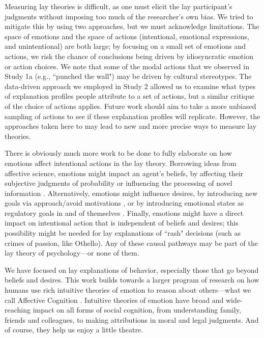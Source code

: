 \documentclass[10pt,letterpaper]{article}
\begin{document}
Measuring lay theories is difficult, as one must elicit the lay participant's judgments without imposing too much of the researcher's own bias. We tried to mitigate this by using two approaches, but we must acknowledge limitations. The space of emotions and the space of actions (intentional, emotional expressions, and unintentional) are both large; by focusing on a small set of emotions and actions, we risk the chance of conclusions being driven by idiosyncratic emotion or action choices. We note that some of the modal actions that we observed in Study 1a (e.g., ``punched the wall") may be driven by cultural stereotypes. The data-driven approach we employed in Study 2 allowed us to examine what types of explanation profiles people attribute to a set of actions, but a similar critique of the choice of actions applies. Future work should aim to take a more unbiased sampling of actions to see if these explanation profiles will replicate. However, the approaches taken here to may lead to new and more precise ways to measure lay theories.

There is obviously much more work to be done to fully elaborate on how emotions affect intentional actions in the lay theory. Borrowing ideas from affective science, emotions might impact an agent's beliefs, by affecting their subjective judgments of probability \cite{Wright1992} or influencing the processing of novel information \cite{Forgas1995}. Alternatively, emotions might influence desires, by introducing new goals via approach/avoid motivations \cite{Carver2004}, or by introducing emotional states as regulatory goals in and of themselves \cite{Gross2006}. Finally, emotions might have a direct impact on intentional action that is independent of beliefs and desires; this possibility might be needed for lay explanations of ``rash" decisions (such as crimes of passion, like Othello). 
Any of these causal pathways may be part of the lay theory of psychology---or none of them.




We have focused on lay explanations of behavior, especially those that go beyond beliefs and desires. This work builds towards a larger program of research on how humans use rich intuitive theories of emotion to reason about others---what we call Affective Cognition \cite{Ong2015AffCog}. Intuitive theories of emotion have broad and wide-reaching impact on all forms of social cognition, from understanding family, friends and colleagues, to making attributions in moral and legal judgments. And of course, they help us enjoy a little theatre. 
\end{document}
